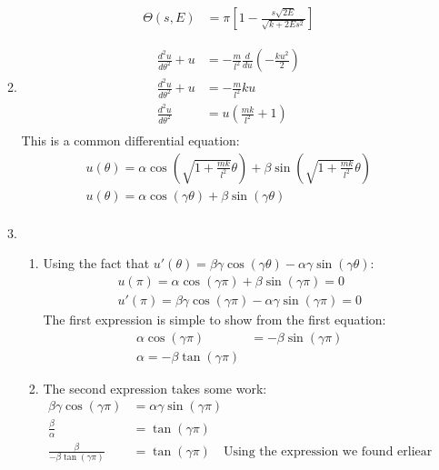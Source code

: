 \documentclass[12pt]{article}
\newcommand{\der}[2]{\frac{d #1}{d #2}}
\begin{document}
\begin{enumerate}
\begin{enumerate}
\begin{align*}
                \Theta(s,E)&=\pi\left[1-\frac{s\sqrt{2E}}{\sqrt{k+2Es^2}}\right]
            \end{align*}
            \item
            \begin{align*}
                \der{^2u}{\theta^2}+u&=-\frac{m}{l^2}\der{}{u}\left(-\frac{ku^2}{2}\right)\\
                \der{^2u}{\theta^2}+u&=-\frac{m}{l^2}ku\\
                \der{^2u}{\theta^2}&=u\left(\frac{mk}{l^2}+1\right)\\
            \end{align*}
            This is a common differential equation:
            \begin{gather*}
                u(\theta)=\alpha\cos\left(\sqrt{1+\frac{mk}{l^2}}\theta  \right)+\beta\sin\left(\sqrt{1+\frac{mk}{l^2}}\theta  \right)\\
                u(\theta)=\alpha\cos\left(\gamma\theta  \right)+\beta\sin\left(\gamma\theta  \right)\\
            \end{gather*}
            \item
            \begin{enumerate}
                \item Using the fact that $u'(\theta)=\beta\gamma\cos(\gamma\theta)-\alpha\gamma\sin(\gamma\theta)$:
                \begin{gather*}
                    u(\pi)=\alpha\cos(\gamma\pi)+\beta\sin(\gamma\pi)=0\\
                    u'(\pi)=\beta\gamma\cos(\gamma\pi)-\alpha\gamma\sin(\gamma\pi)=0
                \end{gather*}
                The first expression is simple to show from the first equation:
                \begin{align*}
                    \alpha\cos(\gamma\pi)&=-\beta\sin(\gamma\pi)\\
                    \alpha=-\beta\tan(\gamma\pi)
                \end{align*}
                \item The second expression takes some work:
                \begin{align*}
                    \beta\gamma\cos(\gamma\pi)&=\alpha\gamma\sin(\gamma\pi)\\
                    \frac{\beta}{\alpha}&=\tan(\gamma\pi)\\
                    \frac{\beta}{-\beta\tan(\gamma\pi)}&=\tan(\gamma\pi)\quad\text{Using the expression we found erliear}\\

\end{align*}
\end{enumerate}
\end{enumerate}
\end{enumerate}
\end{document}
